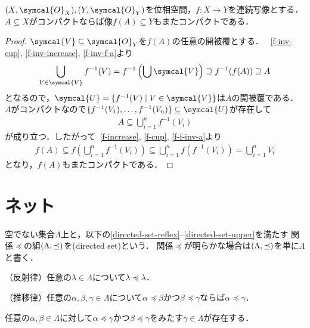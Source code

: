 \documentclass{ltjsbook}
\begin{document}
\begin{thmbox}
\begin{theorem}
\(\tuple{X, \symcal{O}_X}, \tuple{Y, \symcal{O}_Y}\)を位相空間，\(f\colon X \to Y\)を連続写像とする．
\(A \subseteq X\)がコンパクトならば像\(f(A) \subseteq Y\)もまたコンパクトである．
\end{theorem}
\end{thmbox}

\begin{proof}
\(\symcal{V} \subseteq \symcal{O}_Y\)を\(f(A)\)の任意の開被覆とする．
~\ref{f-inv-cup}, \ref{f-inv-increase}, \ref{f-inv-f-a}より
\begin{align*}
    \bigcup_{V \in \symcal{V}} f^{-1}(V)
    = f^{-1} \left(\bigcup  \symcal{V}\right)
    \supseteq f^{-1}(f(A))
    \supseteq A
\end{align*}
となるので，\(\symcal{U} = \{f^{-1}(V) \mid V \in \symcal{V}\}\)は\(A\)の開被覆である．
\(A\)がコンパクトなので\(\{f^{-1}(V_1), \ldots, f^{-1}(V_n)\} \subseteq \symcal{U}\)が存在して
\begin{align*}
    A \subseteq \bigcup_{i = 1}^n f^{-1}(V_i)
\end{align*}
が成り立つ．したがって~\ref{f-increase}, \ref{f-cup}, \ref{f-f-inv-a}より
\begin{align*}
    f(A)
    \subseteq f \left(\bigcup_{i = 1}^n f^{-1}(V_i)\right)
    \subseteq \bigcup_{i = 1}^n f (f^{-1}(V_i))
    = \bigcup_{i = 1}^n V_i
\end{align*}
となり，\(f(A)\)もまたコンパクトである．
\end{proof}

\section{ネット}
\begin{thmbox}
\begin{definition}
空でない集合\(\Lambda\)上と，以下の\ref{directed-set-reflex}--\ref{directed-set-upper}を満たす
関係\(\preceq\)の組\((\Lambda, \preceq)\)を(directed set)という．
関係\(\preceq\)が明らかな場合は\((\Lambda, \preceq)\)を単に\(\Lambda\)と書く．
\begin{conditions}
    \item\label{directed-set-reflex} （反射律）任意の\(\lambda \in \Lambda\)について\(\lambda \preceq \lambda\)．
    \item\label{directed-set-trans} （推移律）任意の\(\alpha, \beta, \gamma \in \Lambda\)について\(\alpha \preceq \beta\)かつ\(\beta \preceq \gamma\)ならば\(\alpha \preceq \gamma\)．
    \item\label{directed-set-upper} 任意の\(\alpha, \beta \in \Lambda\)に対して\(\alpha \preceq \gamma\)かつ\(\beta \preceq \gamma\)をみたす\(\gamma \in \Lambda\)が存在する．
\end{conditions}
\end{definition}
\end{thmbox}
\end{document}
